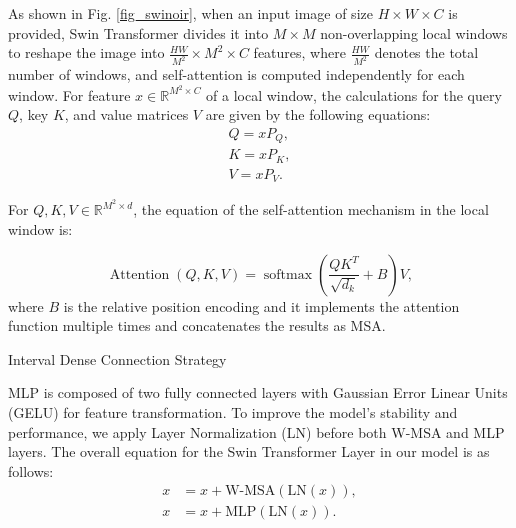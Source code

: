 \documentclass[default,iicol]{sn-jnl}
\theoremstyle{thmstyleone}\newtheorem{theorem}{Theorem}\newtheorem{proposition}[theorem]{Proposition}
\theoremstyle{thmstyletwo}\newtheorem{example}{Example}\newtheorem{remark}{Remark}\theoremstyle{thmstylethree}\newtheorem{definition}{Definition}
\begin{document}
As shown in Fig. \ref{fig_swinoir}, when an input image of size ${H\times W\times C}$ is provided, Swin Transformer divides it into $M\times M$ non-overlapping local windows to reshape the image into $\frac{HW}{M^2}\times M^2\times C$ features, where $\frac{HW}{M^2}$ denotes the total number of windows, and self-attention is computed independently for each window. For feature $x\in\mathbb{R}^{M^2\times C}$ of a local window, the calculations for the query $Q$, key $K$, and value matrices $V$ are given by the following equations:
\begin{equation}
\begin{split}
Q=xP_Q,\\
K=xP_K,\\
V=xP_V.
\end{split}
\end{equation}

For $Q,K,V\in\mathbb{R}^{M^2\times d}$, the equation of the self-attention  mechanism in the local window is:

\begin{equation}
\operatorname{Attention}(Q, K, V)=\operatorname{softmax}(\frac{Q K^{T}}{\sqrt{d_{k}}} + B) V,
\end{equation}
where $B$ is the relative position encoding and it implements the attention function multiple times and concatenates the results as MSA.

\begin{algorithm}
\caption{Interval Dense Connection Strategy}
\label{alg}
\begin{algorithmic}
\EndIf
\EndIf
{}
\EndIf
\EndIf
\EndFor
{}
\EndFor
\end{algorithmic}
\end{algorithm}

MLP is composed of two fully connected layers with Gaussian Error Linear Units (GELU) \cite{hendrycks2016gaussian} for feature transformation. To improve the model's stability and performance, we apply Layer Normalization (LN) \cite{ba2016layer} before both W-MSA and MLP layers. The overall equation for the Swin Transformer Layer in our model is as follows:
\begin{equation}
\begin{split}
x&=x+\text{W-MSA}(\text{LN}(x)),\\
x&=x+\text{MLP}(\text{LN}(x)).
\end{split}
\end{equation}
\end{document}
